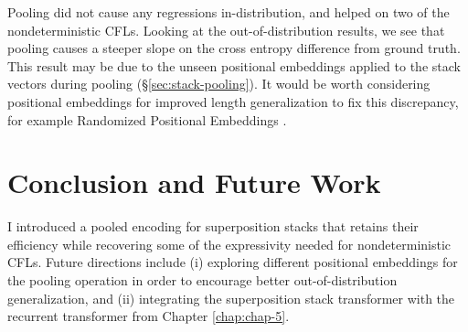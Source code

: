 Pooling did not cause any regressions in-distribution, and helped on two of the nondeterministic CFLs. Looking at the out-of-distribution results, we see that pooling causes a steeper slope on the cross entropy difference from ground truth. This result may be due to the unseen positional embeddings applied to the stack vectors during pooling (\S \ref{sec:stack-pooling}). It would be worth considering positional embeddings for improved length generalization to fix this discrepancy, for example Randomized Positional Embeddings \citep{ruoss-etal-2023-randomized}.

\section{Conclusion and Future Work}
I introduced a pooled encoding for superposition stacks that retains their efficiency while recovering some of the expressivity needed for nondeterministic CFLs.  Future directions include (i) exploring different positional embeddings for the pooling operation in order to encourage better out-of-distribution generalization, and (ii) integrating the superposition stack transformer with the recurrent transformer from Chapter \ref{chap:chap-5}.